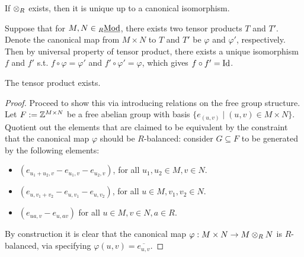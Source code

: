 \documentclass{article}
\begin{document}
\begin{remark}
    If $\otimes_R$ exists, then it is unique up to a canonical isomorphism. 
    
    Suppose that for $M, N \in {}_{R}\underline{\textup{Mod}}$, there exists two tensor products $T$ and $T'$. Denote the canonical map from $M \times N$ to $T$ and $T'$ be $\varphi$ and $\varphi'$, respectively. Then by universal property of tensor product, there exists a unique isomorphism $f$ and $f'$ s.t. $f \circ \varphi = \varphi'$ and $f' \circ \varphi' = \varphi$, which gives $f \circ f' = \mathrm{Id}$.
\end{remark}

\begin{proposition}
    The tensor product exists.
\end{proposition}

\begin{proof}
    Proceed to show this via introducing relations on the free group structure. Let $F := \mathbb{Z}^{M \times N}$ be a free abelian group with basis $\{ e_{(u, v)} \mid (u, v) \in M \times N \}$. Quotient out the elements that are claimed to be equivalent by the constraint that the canonical map $\varphi$ should be $R$-balanced: consider $G \subseteq F$ to be generated by the following elements:
    \begin{itemize}
        \item $(e_{u_1 + u_2, v} - e_{u_1, v} - e_{u_2, v})$, for all $u_1, u_2 \in M, v \in N$.
        \item $(e_{u, v_1 + v_2} - e_{u, v_1} - e_{u, v_2})$, for all $u \in M, v_1, v_2 \in N$.
        \item $(e_{ua, v} - e_{u, av})$ for all $u \in M, v \in N, a \in R$.
    \end{itemize}
    By construction it is clear that the canonical map $\varphi: M \times N \to M \otimes_R N$ is $R$-balanced, via specifying $\varphi(u, v) = \overline{e_{u, v}}$. 


\end{proof}
\end{document}
